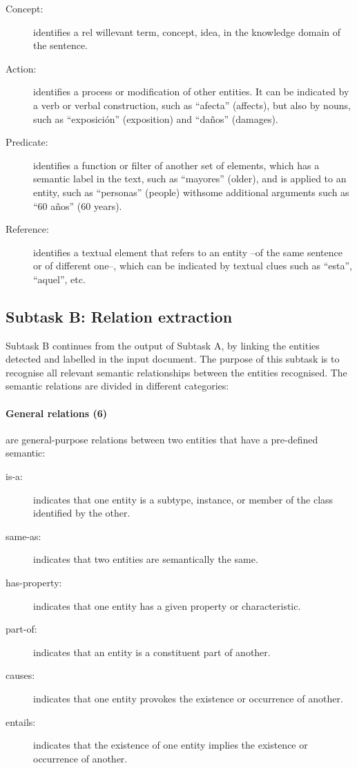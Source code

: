 \documentclass[a4paper,11pt,twocolumn,twoside]{article}
\begin{document}
\begin{description}
  \item[Concept:] identifies a rel willevant term, concept, idea, in the knowledge domain of the sentence.
  \item[Action:] identifies a process or modification of other entities. It can be indicated by a verb or verbal construction, such as “afecta” (affects), but also by nouns, such as “exposición” (exposition) and “daños” (damages).
  \item[Predicate:] identifies a function or filter of another set of elements, which has a semantic label in the text, such as “mayores” (older), and is applied to an entity, such as “personas” (people) withsome additional arguments such as “60 años” (60 years).
  \item[Reference:] identifies a textual element that refers to an entity --of the same sentence or of different one--, which can be indicated by textual clues such as “esta”, “aquel”, etc.
\end{description}

\subsection{Subtask B: Relation extraction}

Subtask B continues from the output of Subtask A, by linking the entities detected and labelled in the input document. The purpose of this subtask is to recognise all relevant semantic relationships between the entities recognised. The semantic relations are divided in different categories:

\paragraph{General relations (6)} are general-purpose relations between two entities that have a pre-defined semantic:

\begin{description}
  \item[is-a:] indicates that one entity is a subtype, instance, or member of the class identified by the other.
  \item[same-as:] indicates that two entities are semantically the same.
  \item[has-property:] indicates that one entity has a given property or characteristic.
  \item[part-of:] indicates that an entity is a constituent part of another.
  \item[causes:] indicates that one entity provokes the existence or occurrence of another.
  \item[entails:] indicates that the existence of one entity implies the existence or occurrence of another.
\end{description}
\end{document}
